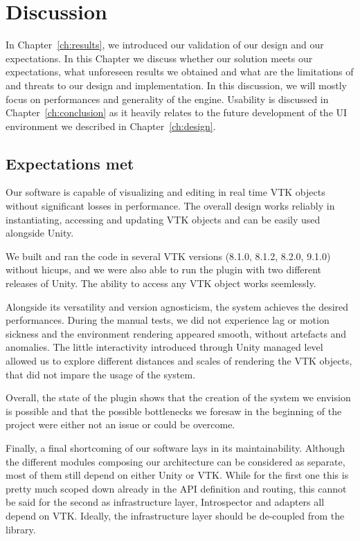 \chapter{Discussion}
\label{ch:discussion}

In Chapter~\ref{ch:results}, we introduced our validation of our design and our expectations. In this Chapter we discuss whether our solution meets our expectations, what unforeseen results we obtained and what are the limitations of and threats to our design and implementation. In this discussion, we will mostly focus on performances and generality of the engine. Usability is discussed in Chapter~\ref{ch:conclusion} as it heavily relates to the future development of the UI environment we described in Chapter~\ref{ch:design}.

\section{Expectations met}

Our software is capable of visualizing and editing in real time VTK objects without significant losses in performance. The overall design works reliably in instantiating, accessing and updating VTK objects and can be easily used alongside Unity.

We built and ran the code in several VTK versions (8.1.0, 8.1.2, 8.2.0, 9.1.0) without hicups, and we were also able to run the plugin with two different releases of Unity. The ability to access any VTK object works seemlessly.

Alongside its versatility and version agnosticism, the system achieves the desired performances. During the manual tests, we did not experience lag or motion sickness and the environment rendering appeared smooth, without artefacts and anomalies. The little interactivity introduced through Unity managed level allowed us to explore different distances and scales of rendering the VTK objects, that did not impare the usage of the system.

Overall, the state of the plugin shows that the creation of the system we envision is possible and that the possible bottlenecks we foresaw in the beginning of the project were either not an issue or could be overcome.

Finally, a final shortcoming of our software lays in its maintainability. Although the different modules composing our architecture can be considered as separate, most of them still depend on either Unity or VTK. While for the first one this is pretty much scoped down already in the API definition and routing, this cannot be said for the second as infrastructure layer, Introspector and adapters all depend on VTK. Ideally, the infrastructure layer should be de-coupled from the library.


